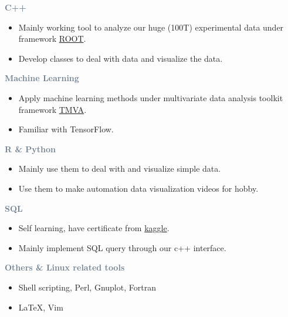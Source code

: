 
\textcolor{SlateGrey}{\textbf{C++}}
\newline

\begin{itemize}
    \item Mainly working tool to analyze our huge (100T) experimental data under framework \href{https://root.cern/}{ROOT}.
    \item Develop classes to deal with data and visualize the data.
\end{itemize}

\textcolor{SlateGrey}{\textbf{Machine Learning}}
\newline
\begin{itemize}
    \item Apply machine learning methods under multivariate data analysis toolkit framework \href{https://root.cern/manual/tmva/}{TMVA}.
    \item Familiar with TensorFlow.
\end{itemize}
      
\textcolor{SlateGrey}{\textbf{R \& Python}}
\newline

\begin{itemize}
    \item Mainly use them to deal with and visualize simple data.
    \item Use them to make automation data visualization videos for hobby. 
\end{itemize}

\textcolor{SlateGrey}{\textbf{SQL}}
\newline

\begin{itemize}
    \item Self learning, have certificate from \href{https://www.kaggle.com/learn/overview}{kaggle}.
    \item Mainly implement SQL query through our c++ interface.
\end{itemize}

\textcolor{SlateGrey}{\textbf{Others \& Linux related tools}}
\newline

\begin{itemize}
    \item Shell scripting, Perl, Gnuplot, Fortran 
    \item \LaTeX, Vim
\end{itemize}

